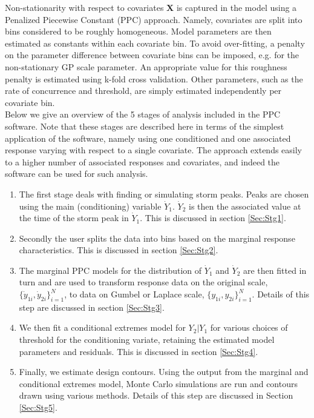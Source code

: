 \documentclass[a4paper,10pt]{article}
\begin{document}
Non-stationarity with respect to covariates $\boldsymbol{X}$ is captured in the model using a Penalized Piecewise Constant (PPC) approach. Namely, covariates are split into bins considered to be roughly homogeneous. Model parameters are then estimated as constants within each covariate bin. To avoid over-fitting, a penalty on the parameter difference between covariate bins can be imposed, e.g. for the non-stationary GP scale parameter. An appropriate value for this roughness penalty is estimated using k-fold cross validation. Other parameters, such as the rate of concurrence and threshold, are simply estimated independently per covariate bin.
\\
Below we give an overview of the 5 stages of analysis included in the PPC software. Note that these stages are described here in terms of the simplest application of the software, namely using one conditioned and one associated response varying with respect to a single covariate. The approach extends easily to a higher number of associated responses and covariates, and indeed the software can be used for such analysis. 
\begin{enumerate}
\item The first stage deals with finding or simulating storm peaks. Peaks are chosen using the main (conditioning) variable $\dot{Y}_1$. $\dot{Y}_2$ is then the associated value at the time of the storm peak in $\dot{Y}_1$. This is discussed in section \ref{Sec:Stg1}.
\item Secondly the user splits the data into bins based on the marginal response characteristics. This is discussed in section \ref{Sec:Stg2}.
\item The marginal PPC models for the distribution of $\dot{Y}_1$ and $\dot{Y}_2$ are then fitted in turn and are used to transform response data on the original scale, $\{\dot{y}_{1i},\dot{y}_{2i}\}_{i=1}^{N}$, to data on Gumbel or Laplace scale, $\{y_{1i},y_{2i}\}_{i=1}^{N}$. Details of this step are discussed in section \ref{Sec:Stg3}.
\item We then fit a conditional extremes model for $Y_2|Y_1$ for various choices of threshold for the conditioning variate, retaining the estimated model parameters and residuals. This is discussed in section \ref{Sec:Stg4}.
\item Finally, we estimate design contours. Using the output from the marginal and conditional extremes model, Monte Carlo simulations are run and contours drawn using various methods. Details of this step are discussed in Section \ref{Sec:Stg5}.
\end{enumerate}
\end{document}
